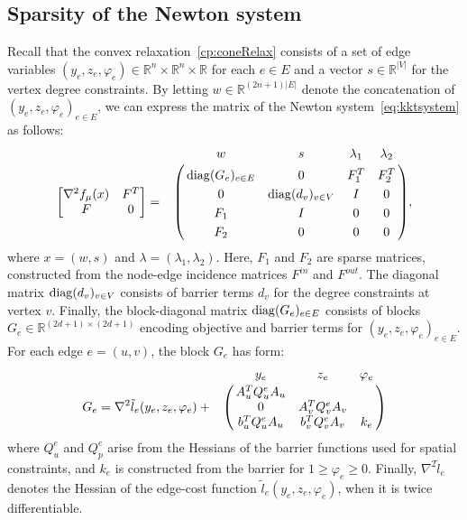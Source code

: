 \documentclass[letterpaper, 11pt]{article}
\begin{document}
\subsection{Sparsity of the Newton system}


Recall that the convex relaxation~\eqref{cp:coneRelax} consists of a set of
edge variables $(y_e , z_e, \varphi_e) \in \mathbb{R}^n \times \mathbb{R}^n \times
\mathbb{R}$ for each $e \in E$ and a vector $s \in \mathbb{R}^{|V|}$ for the
vertex degree constraints.  By letting $w \in \mathbb{R}^{(2n+1)|E|}$ denote
the concatenation of $(y_e, z_e, \varphi_e)_{e \in E}$, we can express the matrix
of the Newton system~\eqref{eq:kktsystem} as follows:
\begin{align}
  \begin{bmatrix}
    \nabla^2 f_\mu(x)  & F^T  \\
    F  & 0 
  \end{bmatrix} = 
  \bordermatrix{~& w & s & \lambda_1 & \lambda_2  \cr
  &  \diag(G_e)_{e \in E}  & 0  &  F_1^T & F_2^T  \cr
  &  0  & \diag(d_v)_{v \in V}   & I & 0\cr
  &  F_1  & I & 0  & 0 \cr
  &  F_2  & 0 & 0  & 0\cr
  },
\end{align}
where $x = (w, s)$ and $\lambda = (\lambda_1, \lambda_2)$.  Here,  $F_1$ and
$F_2$ are sparse matrices, constructed from the node-edge incidence matrices
$F^{in}$ and $F^{out}$.  The diagonal matrix $\operatorname*{diag}(d_v)_{v \in V}$  consists
of barrier terms $d_v$ for the degree constraints at vertex $v$.  Finally, the
block-diagonal matrix $\operatorname*{diag}(G_e)_{e \in E}$ consists of blocks $G_e \in
\mathbb{R}^{ (2d + 1) \times (2d+1)}$ encoding objective and barrier terms for
$(y_e, z_e, \varphi_e)_{e \in E}$. For each edge $e=(u,v)$, the block $G_e$ has
form:
\[
G_e =
\nabla^2 \tilde l_e(y_e, z_e, \varphi_e) +
  \bordermatrix{~& y_e & z_e & \varphi_e  \cr
&  A_u^T Q^e_u A_u  \cr
&    0          & A_v^T Q^e_v A_v \cr
&   b_u^T Q^e_u A_u    & b_v^T Q^e_v A_v      &  k_e  \cr
 }
\]
where   $Q^e_u$  and $Q^e_p$ arise from the Hessians of the barrier functions
used for spatial constraints, and $k_{e}$ is constructed from the barrier for
$1 \ge \varphi_e \ge 0$.  Finally, $\nabla^2 \tilde l_e$ denotes the Hessian of
the edge-cost function $\tilde l_e(y_e, z_e, \varphi_e)$, when it is twice
differentiable.



\end{document}
